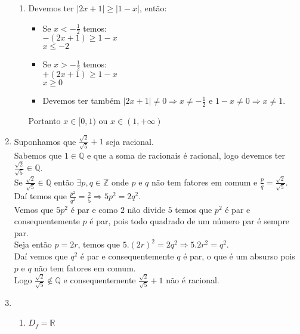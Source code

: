 \documentclass[12pt]{article}
\begin{document}
\begin{enumerate}
\begin{enumerate}
 \item Devemos ter $|2x+1|\geq|1-x|$, então:
  \begin{itemize}
  \item Se $x<-\frac{1}{2}$ temos:\\
  $-(2x+1)\geq1-x$\\
  $x\leq-2$\\
  \item Se $x>-\frac{1}{2}$ temos:\\
  $+(2x+1)\geq1-x$\\
  $x\geq0$\\
  \item Devemos ter também $|2x+1|\neq0 \Rightarrow x\neq-\frac{1}{2}$ e $1-x\neq0 \Rightarrow x\neq 1$.
  \end{itemize}
  Portanto $x\in[0,1)$ ou $x\in(1,+\infty)$\\
 \end{enumerate}
 

\item
 Suponhamos que $\frac{\sqrt{2}}{\sqrt{5}}+1$ seja racional.\\
 Sabemos que $1\in\mathbb{Q}$ e que a soma de racionais é racional, logo devemos ter $\frac{\sqrt{2}}{\sqrt{5}}\in\mathbb{Q}$.\\
 Se $\frac{\sqrt{2}}{\sqrt{5}}\in\mathbb{Q}$ então $\exists p,q\in\mathbb{Z}$ onde $p$ e $q$ não tem fatores em comum e $\frac{p}{q}=\frac{\sqrt{2}}{\sqrt{5}}$.\\
 Daí temos que $\frac{p^2}{q^2}=\frac{2}{5}\Rightarrow5p^2=2q^2$.\\
 Vemos que $5p^2$ é par e como $2$ não divide $5$ temos que $p^2$ é par e consequentemente $p$ é par, pois todo quadrado de um número par é sempre par.\\
 Seja então $p=2r$, temos que $5.(2r)^2=2q^2\Rightarrow5.2r^2=q^2$.\\
 Daí vemos que $q^2$ é par e consequentemente $q$ é par, o que é um absurso pois $p$ e $q$ não tem fatores em comum.\\
 Logo $\frac{\sqrt{2}}{\sqrt{5}}\not\in\mathbb{Q}$ e consequentemente $\frac{\sqrt{2}}{\sqrt{5}}+1$ não é racional.


\item
 \begin{enumerate}
 \item $D_f=\mathbb{R}$


\end{enumerate}
\end{enumerate}
\end{document}
